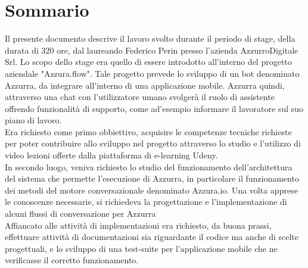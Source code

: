 
\cleardoublepage
{}
{}
\begingroup
\let\clearpage\relax
\let\cleardoublepage\relax
\let\cleardoublepage\relax

\chapter*{Sommario}

Il presente documento descrive il lavoro svolto durante il periodo di stage, della durata di 320 ore, dal laureando Federico Perin presso l'azienda AzzurroDigitale Srl.
Lo scopo dello stage era quello di essere introdotto all'interno del progetto aziendale "Azzura.flow". Tale progetto prevede lo sviluppo di un bot denominato Azzurra, da integrare all'interno di una applicazione mobile. Azzurra quindi, attraverso una chat con l'utilizzatore umano svolgerà il ruolo di assistente offrendo funzionalità di supporto, come ad'esempio informare il lavoratore sul suo piano di lavoro. \\
 Era richiesto come primo obbiettivo, acquisire le competenze tecniche richieste per poter contribuire allo sviluppo nel progetto attraverso lo studio e l'utilizzo di video lezioni offerte dalla piattaforma di e-learning Udeny.\\
  In secondo luogo, veniva richiesto lo studio del funzionamento dell'architettura del sistema che permette l'esecuzione di Azzurra, in particolare il funzionamento dei metodi del motore conversazionale denominato Azzura.io. Una volta apprese le conoscenze necessarie, si richiedeva la progettazione e l'implementazione di alcuni flussi di conversazione per Azzurra \\
   Affiancato alle attività di implementazioni era richiesto, da buona prassi, effettuare attività di documentazioni sia riguardante il codice ma anche di scelte progettuali, e lo sviluppo di una test-suite per l'applicazione mobile che ne verificasse il corretto funzionamento.




%
%

\endgroup			

\vfill

